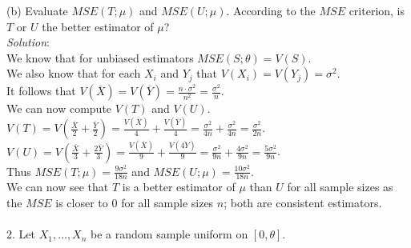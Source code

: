 \documentclass[12pt]{article}
\newcommand{\XB}{\color{black}}
\newcommand{\XBB}{\color{blue}}
\begin{document}

(b) Evaluate $ MSE(T; \mu) $ and $ MSE(U; \mu) $. According to the $ MSE $ criterion, is $ T $ or $ U $ the better estimator of $ \mu $?
\vspace{2.5mm} \\
\textit{Solution}:
\vspace{2.5mm} \\

\noindent
We know that for unbiased estimators $ MSE(S;\theta) = V(S) $. \\

\noindent
We also know that for each $ X_{i} $ and $ Y_{j} $ that $ V(X_{i}) = V(Y_{j}) = \sigma^{2} $. \\

\noindent
It follows that $ \displaystyle V(\overline{X}) = V(\overline{Y}) = \frac{n \cdot \sigma^{2}}{n^{2}} = \frac{\sigma^{2}}{n} $. \\

\noindent
We can now compute $ V(T) $ and $ V(U) $. \\

\noindent
$ \displaystyle V(T) = V(\frac{\overline{X}}{2} + \frac{\overline{Y}}{2}) = \frac{V(\overline{X})}{4} + \frac{V(\overline{Y})}{4} = \frac{\sigma^2}{4n} + \frac{\sigma^2}{4n} = \frac{\sigma^2}{2n} $. \\

\noindent
$ \displaystyle V(U) = V(\frac{\overline{X}}{3} + \frac{2\overline{Y}}{3}) = \frac{V(\overline{X})}{9} + \frac{V(\overline{4Y})}{9} = \frac{\sigma^2}{9n} + \frac{4\sigma^2}{9n} = \frac{5\sigma^2}{9n} $. \\

\noindent
Thus $ \displaystyle MSE(T; \mu) = \frac{9\sigma^2}{18n} $ and $ \displaystyle MSE(U; \mu) = \frac{10\sigma^{2}}{18n} $. \\

\noindent
We can now see that $ T $ is a better estimator of $ \mu $ than $ U $ for all sample sizes as the $ MSE $ is closer to $ 0 $ for all sample sizes $ n $; both are consistent estimators. \\

\newpage
\XBB\hrulefill\XB \\

2. Let $ X_{1},\dots,X_{n} $ be a random sample uniform on $ [0,\theta] $.
\end{document}
